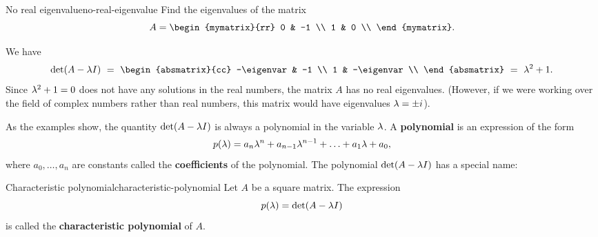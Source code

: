 \begin{example}{No real eigenvalue}{no-real-eigenvalue}
  Find the eigenvalues of the matrix
  \begin{equation*}
    A=\begin{mymatrix}{rr}
      0 & -1 \\
      1 &  0 \\
    \end{mymatrix}.
  \end{equation*}
\end{example}

\begin{solution}
  We have
  \begin{equation*}
    \det(A-\eigenvar I)
    ~=~
        \begin{absmatrix}{cc}
          -\eigenvar & -1 \\
          1 & -\eigenvar \\
        \end{absmatrix} \\
    ~=~
        \eigenvar^2 + 1.
  \end{equation*}
  Since $\lambda^2+1 = 0$ does not have any solutions in the real
  numbers, the matrix $A$ has no real eigenvalues. (However, if we
  were working over the field of complex numbers rather than real
  numbers, this matrix would have eigenvalues $\lambda=\pm i$).
\end{solution}

As the examples show, the quantity $\det(A-\lambda I)$ is always a
polynomial in the variable $\lambda$. A \textbf{polynomial}%
 is an expression of the form
\begin{equation*}
  p(\lambda) = a_n\lambda^n + a_{n-1}\lambda^{n-1} + \ldots + a_1\lambda + a_0,
\end{equation*}
where $a_0,\ldots,a_n$ are constants called the \textbf{coefficients}
of the polynomial. The polynomial $\det(A-\lambda I)$ has a special
name:

\begin{definition}{Characteristic polynomial}{characteristic-polynomial}
  Let $A$ be a square matrix. The expression
  \begin{equation*}
    p(\lambda) = \det(A-\lambda I)
  \end{equation*}
  is called the \textbf{characteristic polynomial}%
   of $A$.
\end{definition}

